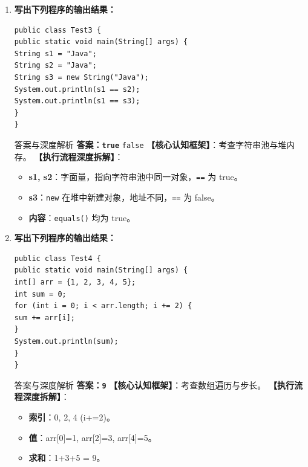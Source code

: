 \documentclass[12pt, a4paper]{ctexart}
\newcommand{\code}[1]{\texttt{#1}}
\begin{document}
\begin{enumerate}[label=\textbf{\arabic*.}, leftmargin=*, itemsep=1.5em]
\item \textbf{写出下列程序的输出结果：}
\begin{lstlisting}[style=JavaExam]
public class Test3 {
public static void main(String[] args) {
String s1 = "Java";
String s2 = "Java";
String s3 = new String("Java");
System.out.println(s1 == s2);
System.out.println(s1 == s3);
}
}
\end{lstlisting}
\begin{bluebox}{答案与深度解析}
\textbf{答案：\code{true}} \newline \code{false}
\textbf{【核心认知框架】}：考查字符串池与堆内存。
\textbf{【执行流程深度拆解】}：
\begin{itemize}[leftmargin=*, nosep]
    \item \textbf{s1, s2}：字面量，指向字符串池中同一对象，\code{==} 为 true。
    \item \textbf{s3}：\code{new} 在堆中新建对象，地址不同，\code{==} 为 false。
    \item \textbf{内容}：\code{equals()} 均为 true。
\end{itemize}
\end{bluebox}

\item \textbf{写出下列程序的输出结果：}
\begin{lstlisting}[style=JavaExam]
public class Test4 {
public static void main(String[] args) {
int[] arr = {1, 2, 3, 4, 5};
int sum = 0;
for (int i = 0; i < arr.length; i += 2) {
sum += arr[i];
}
System.out.println(sum);
}
}
\end{lstlisting}
\begin{bluebox}{答案与深度解析}
\textbf{答案：\code{9}}
\textbf{【核心认知框架】}：考查数组遍历与步长。
\textbf{【执行流程深度拆解】}：
\begin{itemize}[leftmargin=*, nosep]
    \item \textbf{索引}：0, 2, 4 (i+=2)。
    \item \textbf{值}：arr[0]=1, arr[2]=3, arr[4]=5。
    \item \textbf{求和}：1+3+5 = 9。
\end{itemize}
\end{bluebox}


\end{enumerate}
\end{document}
